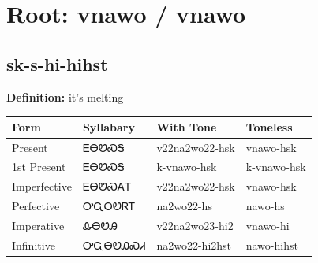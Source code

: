 \documentclass{article}%
\begin{document}
%
\normalsize%
\section*{Root: vnawo / vnawo}%
\subsection*{sk-s-hi-hihst}%
\textbf{Definition: }%
it’s melting%
\\[0.5em]%
\begin{tabular}{|l|l|l|l|}%
\hline%
\textbf{Form}&\textbf{Syllabary}&\textbf{With Tone}&\textbf{Toneless}\\%
\hline%
Present&ᎬᎾᏬᏍᎦ&v22na2wo22{-}hsk&vnawo{-}hsk\\%
1st Present&ᎬᎾᏬᏍᎦ&k{-}vnawo{-}hsk&k{-}vnawo{-}hsk\\%
Imperfective&ᎬᎾᏬᏍᎪᎢ&v22na2wo22{-}hsk&vnawo{-}hsk\\%
Perfective&ᎤᏩᎾᏬᏒᎢ&na2wo22{-}hs&nawo{-}hs\\%
Imperative&ᎲᎾᏬᎯ&v22na2wo23{-}hi2&vnawo{-}hi\\%
Infinitive&ᎤᏩᎾᏬᎯᏍᏗ&na2wo22{-}hi2hst&nawo{-}hihst\\%
\hline%
\end{tabular}%
\\[1em]%
\end{document}
